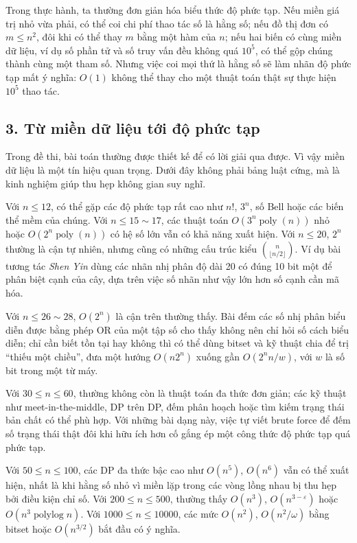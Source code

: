 \documentclass[11pt]{article}
\begin{document}
Trong thực hành, ta thường đơn giản hóa biểu thức độ phức tạp. Nếu miền giá trị
nhỏ vừa phải, có thể coi chi phí thao tác số là hằng số; nếu đồ thị đơn có
\(m\le n^2\), đôi khi có thể thay \(m\) bằng một hàm của \(n\); nếu hai biến có
cùng miền dữ liệu, ví dụ số phần tử và số truy vấn đều không quá \(10^5\), có
thể gộp chúng thành cùng một tham số. Nhưng việc coi mọi thứ là hằng số sẽ làm
nhãn độ phức tạp mất ý nghĩa: \(O(1)\) không thể thay cho một thuật toán thật
sự thực hiện \(10^5\) thao tác.

\subsection*{3. Từ miền dữ liệu tới độ phức tạp}

Trong đề thi, bài toán thường được thiết kế để có lời giải qua được. Vì vậy
miền dữ liệu là một tín hiệu quan trọng. Dưới đây không phải bảng luật cứng,
mà là kinh nghiệm giúp thu hẹp không gian suy nghĩ.

Với \(n\le 12\), có thể gặp các độ phức tạp rất cao như \(n!\), \(3^n\), số
Bell hoặc các biến thể mềm của chúng. Với \(n\le 15\sim17\), các thuật toán
\(O(3^n\operatorname{poly}(n))\) nhỏ hoặc \(O(2^n\operatorname{poly}(n))\) có
hệ số lớn vẫn có khả năng xuất hiện. Với \(n\le20\), \(2^n\) thường là cận
tự nhiên, nhưng cũng có những cấu trúc kiểu \(\binom n{\lfloor n/2\rfloor}\).
Ví dụ bài tương tác \emph{Shen Yin} dùng các nhãn nhị phân độ dài 20 có đúng
10 bit một để phân biệt cạnh của cây, dựa trên việc số nhãn như vậy lớn hơn số
cạnh cần mã hóa.

Với \(n\le26\sim28\), \(O(2^n)\) là cận trên thường thấy. Bài đếm các số nhị
phân biểu diễn được bằng phép OR của một tập số cho thấy không nên chỉ hỏi số
cách biểu diễn; chỉ cần biết tồn tại hay không thì có thể dùng bitset và kỹ
thuật chia để trị ``thiếu một chiều'', đưa một hướng \(O(n2^n)\) xuống gần
\(O(2^n n/w)\), với \(w\) là số bit trong một từ máy.

Với \(30\le n\le60\), thường không còn là thuật toán đa thức đơn giản; các kỹ
thuật như meet-in-the-middle, DP trên DP, đếm phân hoạch hoặc tìm kiếm trạng
thái bản chất có thể phù hợp. Với những bài dạng này, việc tự viết brute force
để đếm số trạng thái thật đôi khi hữu ích hơn cố gắng ép một công thức độ phức
tạp quá phức tạp.

Với \(50\le n\le100\), các DP đa thức bậc cao như \(O(n^5)\), \(O(n^6)\) vẫn có
thể xuất hiện, nhất là khi hằng số nhỏ vì miền lặp trong các vòng lồng nhau bị
thu hẹp bởi điều kiện chỉ số. Với \(200\le n\le500\), thường thấy \(O(n^3)\),
\(O(n^{3-\varepsilon})\) hoặc \(O(n^3\operatorname{polylog}n)\). Với
\(1000\le n\le10000\), các mức \(O(n^2)\), \(O(n^2/\omega)\) bằng bitset hoặc
\(O(n^{3/2})\) bắt đầu có ý nghĩa.
\end{document}
